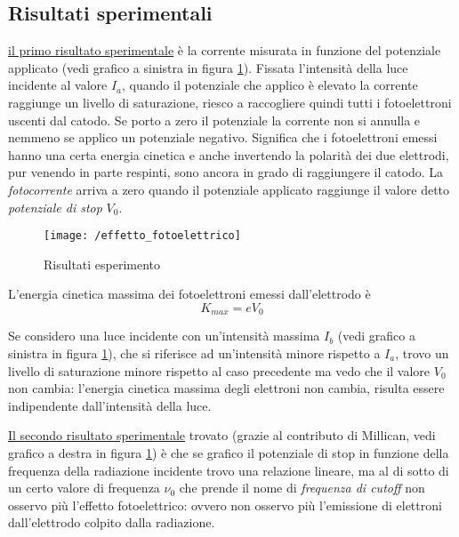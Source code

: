 \subsection{Risultati sperimentali}
\underline{il primo risultato sperimentale} è la corrente misurata in funzione del potenziale applicato (vedi grafico a sinistra in figura \ref{risultati_Lenard}).
Fissata l'intensità della luce incidente al valore $I_a$, quando il potenziale che applico è elevato la corrente raggiunge un livello di saturazione, riesco a raccogliere quindi tutti i fotoelettroni uscenti dal catodo.
Se porto a zero il potenziale la corrente non si annulla e nemmeno se applico un potenziale negativo. 
Significa che i fotoelettroni emessi hanno una certa energia cinetica e anche invertendo la polarità dei due elettrodi, pur venendo in parte respinti, sono ancora in grado di raggiungere il catodo.
La \textit{fotocorrente} arriva a zero quando il potenziale applicato raggiunge il valore detto \textit{potenziale di stop} $V_0$.

\begin{figure}[h]
\centering
\texttt{[image: /effetto\_fotoelettrico]}
\caption{Risultati esperimento}
\label{risultati_Lenard}
\end{figure}

L'energia cinetica massima dei fotoelettroni emessi dall'elettrodo è
\begin{equation}
K_{max} = e V_0
\end{equation}

Se considero una luce incidente con un'intensità massima $I_b$ (vedi grafico a sinistra in figura \ref{risultati_Lenard}), che si riferisce ad un'intensità minore rispetto a $I_a$, trovo un livello di saturazione minore rispetto al caso precedente ma vedo che il valore $V_0$ non cambia: l'energia cinetica massima degli elettroni non cambia, risulta essere indipendente dall'intensità della luce.

\underline{Il secondo risultato sperimentale} trovato (grazie al contributo di Millican, vedi grafico a destra in figura \ref{risultati_Lenard}) è che se grafico il potenziale di stop in funzione della frequenza della radiazione incidente trovo una relazione lineare, ma al di sotto di un certo valore di frequenza $\nu_0$ che prende il nome di \textit{frequenza di cutoff} non osservo più l'effetto fotoelettrico: ovvero non osservo più l'emissione di elettroni dall'elettrodo colpito dalla radiazione.




